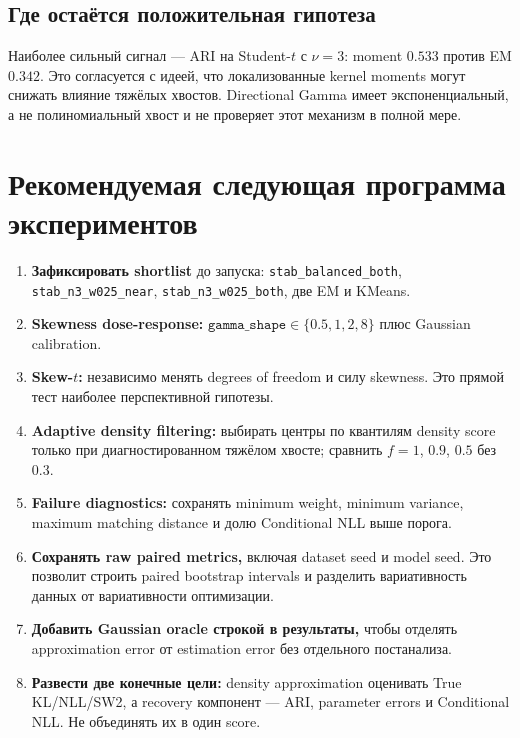 \documentclass[11pt,a4paper]{article}
\newcommand{\code}[1]{{\footnotesize\nolinkurl{#1}}}
\begin{document}
\subsection{Где остаётся положительная гипотеза}

Наиболее сильный сигнал --- ARI на Student-$t$ с $\nu=3$:
moment $0.533$ против EM $0.342$. Это согласуется с идеей, что
локализованные kernel moments могут снижать влияние тяжёлых хвостов.
Directional Gamma имеет экспоненциальный, а не полиномиальный хвост и не
проверяет этот механизм в полной мере.

\section{Рекомендуемая следующая программа экспериментов}

\begin{enumerate}
  \item \textbf{Зафиксировать shortlist} до запуска:
    \code{stab_balanced_both}, \code{stab_n3_w025_near},
    \code{stab_n3_w025_both}, две EM и KMeans.
  \item \textbf{Skewness dose-response:}
    $\texttt{gamma\_shape}\in\{0.5,1,2,8\}$ плюс Gaussian calibration.
  \item \textbf{Skew-$t$:} независимо менять degrees of freedom и силу
    skewness. Это прямой тест наиболее перспективной гипотезы.
  \item \textbf{Adaptive density filtering:} выбирать центры по квантилям
    density score только при диагностированном тяжёлом хвосте; сравнить
    $f=1$, $0.9$, $0.5$ без $0.3$.
  \item \textbf{Failure diagnostics:} сохранять minimum weight, minimum
    variance, maximum matching distance и долю Conditional NLL выше порога.
  \item \textbf{Сохранять raw paired metrics,} включая dataset seed и model
    seed. Это позволит строить paired bootstrap intervals и разделить
    вариативность данных от вариативности оптимизации.
  \item \textbf{Добавить Gaussian oracle строкой в результаты,} чтобы
    отделять approximation error от estimation error без отдельного
    постанализа.
  \item \textbf{Развести две конечные цели:}
    density approximation оценивать True KL/NLL/SW2, а recovery компонент ---
    ARI, parameter errors и Conditional NLL. Не объединять их в один score.
\end{enumerate}
\end{document}
